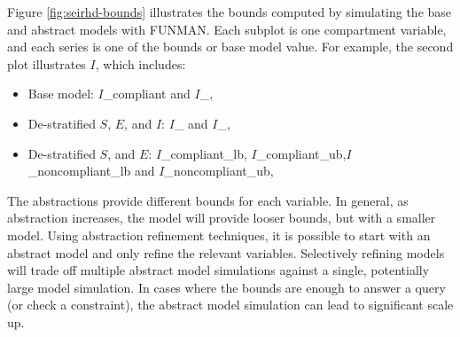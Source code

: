 Figure \ref{fig:seirhd-bounds} illustrates the bounds computed by simulating the base and abstract models with FUNMAN.  Each subplot is one compartment variable, and each series is one of the bounds or base model value.  For example, the second plot illustrates $I$, which includes:
\begin{itemize}
    \item Base model: $I$\_compliant and $I$\_, 
    \item De-stratified $S$, $E$, and $I$:  $I$\_ and $I$\_,
     \item De-stratified $S$, and $E$:  $I$\_compliant\_lb, $I$\_compliant\_ub,$I$\_noncompliant\_lb and $I$\_noncompliant\_ub,
\end{itemize}
The abstractions provide different bounds for each variable.  In general, as abstraction increases, the model will provide looser bounds, but with a smaller model.  Using abstraction refinement techniques, it is possible to start with an abstract model and only refine the relevant variables.  Selectively refining models will trade off multiple abstract model simulations against a single, potentially large model simulation.  In cases where the bounds are enough to answer a query (or check a constraint), the abstract model simulation can lead to significant scale up.  